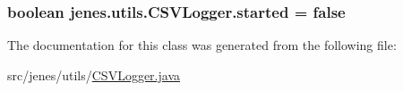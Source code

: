 \hypertarget{classjenes_1_1utils_1_1_c_s_v_logger_a7ddf63656836e437a692c15feb38ef8f}{
\subsubsection[{started}]{\setlength{\rightskip}{0pt plus 5cm}boolean jenes.\-utils.\-C\-S\-V\-Logger.\-started = false\hspace{0.3cm}{\ttfamily [private]}}}\label{classjenes_1_1utils_1_1_c_s_v_logger_a7ddf63656836e437a692c15feb38ef8f}


The documentation for this class was generated from the following file\-:\begin{DoxyCompactItemize}
\item 
src/jenes/utils/\hyperlink{_c_s_v_logger_8java}{C\-S\-V\-Logger.\-java}\end{DoxyCompactItemize}
